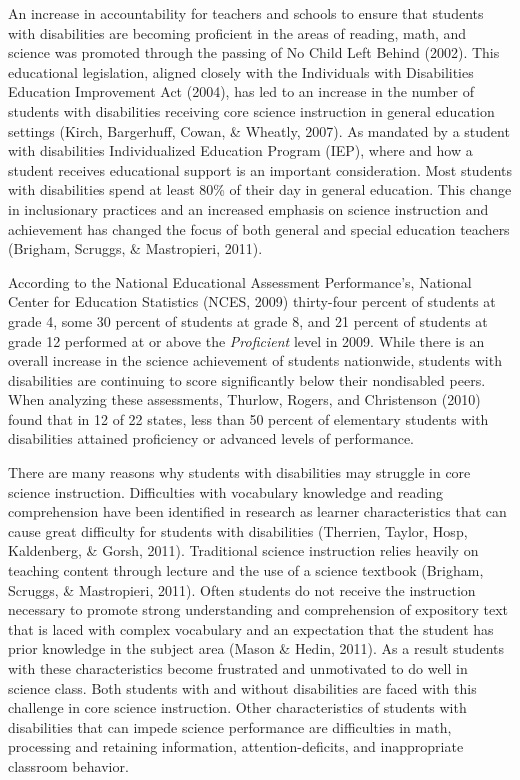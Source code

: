 \documentclass[11.5pt]{sig-alternate} %
\begin{document}
\pagebreak
\clearpage
\begin{large}
An increase in accountability for teachers and schools to ensure that students with disabilities are becoming proficient in the areas of reading, math, and science was promoted through the passing of No Child Left Behind (2002). This educational legislation, aligned closely with the Individuals with Disabilities Education Improvement Act (2004), has led to an increase in the number of students with disabilities receiving core science instruction in general education settings (Kirch, Bargerhuff, Cowan, \& Wheatly, 2007). As mandated by a student with disabilities Individualized Education Program (IEP), where and how a student receives educational support is an important consideration. Most students with disabilities spend at least 80\% of their day in general education. This change in inclusionary practices and an increased emphasis on science instruction and achievement has changed the focus of both general and special education teachers (Brigham, Scruggs, \& Mastropieri, 2011).

According to the National Educational Assessment Performance’s, National Center for Education Statistics (NCES, 2009) thirty-four percent of students at grade 4, some 30 percent of students at grade 8, and 21 percent of students at grade 12 performed at or above the \textit{Proficient} level in 2009. While there is an overall increase in the science achievement of students nationwide, students with disabilities are continuing to score significantly below their nondisabled peers. When analyzing these assessments, Thurlow, Rogers, and Christenson (2010) found that in 12 of 22 states, less than 50 percent of elementary students with disabilities attained proficiency or advanced levels of performance.

There are many reasons why students with disabilities may struggle in core science instruction. Difficulties with vocabulary knowledge and reading comprehension have been identified in research as learner characteristics that can cause great difficulty for students with disabilities (Therrien, Taylor, Hosp, Kaldenberg, \& Gorsh, 2011). Traditional science instruction relies heavily on teaching content through lecture and the use of a science textbook (Brigham, Scruggs, \& Mastropieri, 2011). Often students do not receive the instruction necessary to promote strong understanding and comprehension of expository text that is laced with complex vocabulary and an expectation that the student has prior knowledge in the subject area (Mason \& Hedin, 2011). As a result students with these characteristics become frustrated and unmotivated to do well in science class. Both students with and without disabilities are faced with this challenge in core science instruction. Other characteristics of students with disabilities that can impede science performance are difficulties in math, processing and retaining information, attention-deficits, and inappropriate classroom behavior.


\end{large}
\end{document}

